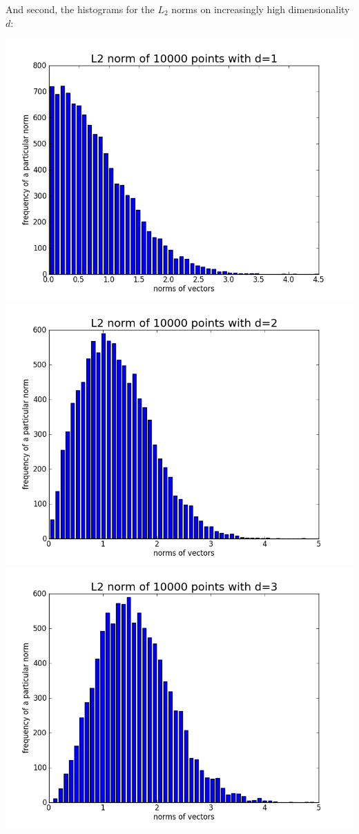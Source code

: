 \documentclass[11pt]{article}
\begin{document}
And second, the histograms for the $L_2$ norms on increasingly high dimensionality $d$:

\begin{center}
\includegraphics[scale=0.25]{p2d1.png}
\includegraphics[scale=0.25]{p2d2.png}
\includegraphics[scale=0.25]{p2d3.png}

\end{center}
\end{document}
